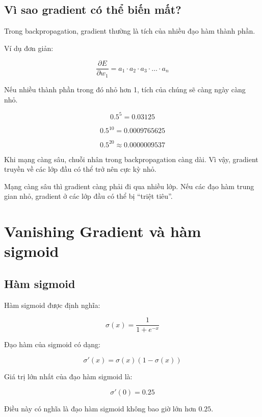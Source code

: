 \documentclass[12pt,a4paper]{report}
\begin{document}
\section{Vì sao gradient có thể biến mất?}

Trong backpropagation, gradient thường là tích của nhiều đạo hàm thành phần.

Ví dụ đơn giản:

\[
    \frac{\partial E}{\partial w_1}
    =
    a_1 \cdot a_2 \cdot a_3 \cdot \ldots \cdot a_n
\]

Nếu nhiều thành phần trong đó nhỏ hơn 1, tích của chúng sẽ càng ngày càng nhỏ.

\[
    0.5^5 = 0.03125
\]

\[
    0.5^{10} = 0.0009765625
\]

\[
    0.5^{20} \approx 0.0000009537
\]

Khi mạng càng sâu, chuỗi nhân trong backpropagation càng dài. Vì vậy, gradient truyền về các lớp đầu có thể trở nên cực kỳ nhỏ.

\begin{ghinho}
Mạng càng sâu thì gradient càng phải đi qua nhiều lớp. Nếu các đạo hàm trung gian nhỏ, gradient ở các lớp đầu có thể bị ``triệt tiêu''.
\end{ghinho}

\chapter{Vanishing Gradient và hàm sigmoid}

\section{Hàm sigmoid}

Hàm sigmoid được định nghĩa:

\[
    \sigma(x)=\frac{1}{1+e^{-x}}
\]

Đạo hàm của sigmoid có dạng:

\[
    \sigma'(x)=\sigma(x)(1-\sigma(x))
\]

Giá trị lớn nhất của đạo hàm sigmoid là:

\[
    \sigma'(0)=0.25
\]

Điều này có nghĩa là đạo hàm sigmoid không bao giờ lớn hơn $0.25$.

\begin{center}
\end{center}
\end{document}
